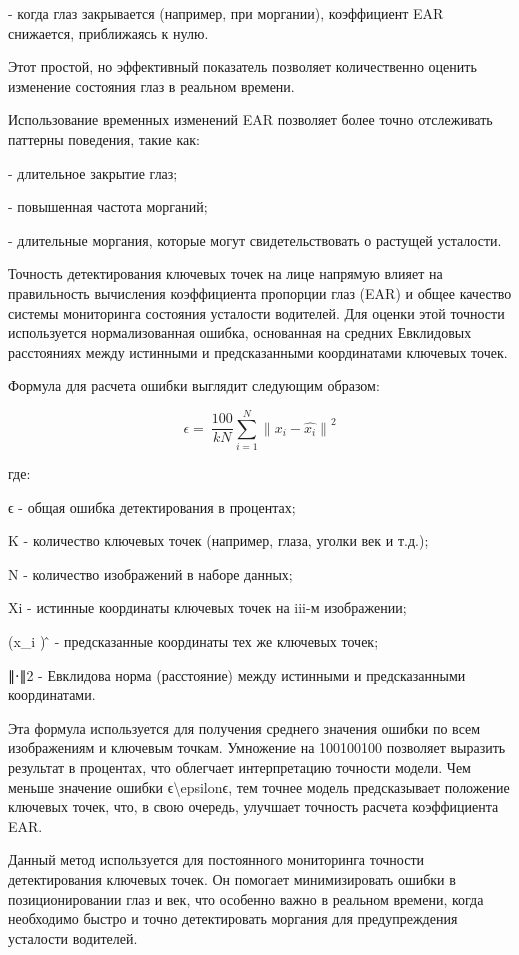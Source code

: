 \begin{multicols}{2}
- когда глаз закрывается (например, при моргании), коэффициент EAR
снижается, приближаясь к нулю.

Этот простой, но эффективный показатель позволяет количественно оценить
изменение состояния глаз в реальном времени.

Использование временных изменений EAR позволяет более точно отслеживать
паттерны поведения, такие как:

- длительное закрытие глаз;

- повышенная частота морганий;

- длительные моргания, которые могут свидетельствовать о растущей
усталости.

Точность детектирования ключевых точек на лице напрямую влияет на
правильность вычисления коэффициента пропорции глаз (EAR) и общее
качество системы мониторинга состояния усталости водителей. Для оценки
этой точности используется нормализованная ошибка, основанная на средних
Евклидовых расстояниях между истинными и предсказанными координатами
ключевых точек.

Формула для расчета ошибки выглядит следующим образом:

\begin{equation}
    \epsilon = \ \frac{100}{kN}\sum_{i = 1}^{N}{\parallel x_{i} - \widehat{x_{i}} \parallel}^{2}
\end{equation}

где:

ϵ - общая ошибка детектирования в процентах;

Κ - количество ключевых точек (например, глаза, уголки век и т.д.);

N - количество изображений в наборе данных;

Xi - истинные координаты ключевых точек на iii-м изображении;

(x\_i ) ̂ - предсказанные координаты тех же ключевых точек;

∥⋅∥2 - Евклидова норма (расстояние) между истинными и предсказанными
координатами.

Эта формула используется для получения среднего значения ошибки по всем
изображениям и ключевым точкам. Умножение на 100100100 позволяет
выразить результат в процентах, что облегчает интерпретацию точности
модели. Чем меньше значение ошибки ϵ\textbackslash epsilonϵ, тем точнее
модель предсказывает положение ключевых точек, что, в свою очередь,
улучшает точность расчета коэффициента EAR.

Данный метод используется для постоянного мониторинга точности
детектирования ключевых точек. Он помогает минимизировать ошибки в
позиционировании глаз и век, что особенно важно в реальном времени,
когда необходимо быстро и точно детектировать моргания для
предупреждения усталости водителей.


\end{multicols}
